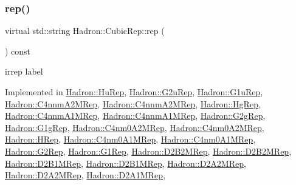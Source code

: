 \subsubsection{\texorpdfstring{rep()}{rep()}\hspace{0.1cm}{\footnotesize\ttfamily [2/2]}}
{\footnotesize\ttfamily virtual std\+::string Hadron\+::\+Cubic\+Rep\+::rep (\begin{DoxyParamCaption}{ }\end{DoxyParamCaption}) const\hspace{0.3cm}{\ttfamily [pure virtual]}}

irrep label 

Implemented in \mbox{\hyperlink{structHadron_1_1HuRep_a4c8b93e1cd7db1a4bacd489f7bb90dbd}{Hadron\+::\+Hu\+Rep}}, \mbox{\hyperlink{structHadron_1_1G2uRep_ad0a703d8c70aacc4601afb6c47ca40b3}{Hadron\+::\+G2u\+Rep}}, \mbox{\hyperlink{structHadron_1_1G1uRep_a3c25822b246f892ed1eef8aeb4ae8252}{Hadron\+::\+G1u\+Rep}}, \mbox{\hyperlink{structHadron_1_1C4nnmA2MRep_a08a21eab24db1e7b93cde52766cfee0b}{Hadron\+::\+C4nnm\+A2\+M\+Rep}}, \mbox{\hyperlink{structHadron_1_1C4nnmA2MRep_a08a21eab24db1e7b93cde52766cfee0b}{Hadron\+::\+C4nnm\+A2\+M\+Rep}}, \mbox{\hyperlink{structHadron_1_1HgRep_a229b19e7f1d4fa443b715de9b5ed4454}{Hadron\+::\+Hg\+Rep}}, \mbox{\hyperlink{structHadron_1_1C4nnmA1MRep_af64812449271d9ce89fbba35fc41f7b7}{Hadron\+::\+C4nnm\+A1\+M\+Rep}}, \mbox{\hyperlink{structHadron_1_1C4nnmA1MRep_af64812449271d9ce89fbba35fc41f7b7}{Hadron\+::\+C4nnm\+A1\+M\+Rep}}, \mbox{\hyperlink{structHadron_1_1G2gRep_a18380ef621e1c6761e5a8b3ff7170f87}{Hadron\+::\+G2g\+Rep}}, \mbox{\hyperlink{structHadron_1_1G1gRep_ad03cbfd3310a65b26937f01ebaa044dd}{Hadron\+::\+G1g\+Rep}}, \mbox{\hyperlink{structHadron_1_1C4nm0A2MRep_a32eaa35da406679229721f90a391ff76}{Hadron\+::\+C4nm0\+A2\+M\+Rep}}, \mbox{\hyperlink{structHadron_1_1C4nm0A2MRep_a32eaa35da406679229721f90a391ff76}{Hadron\+::\+C4nm0\+A2\+M\+Rep}}, \mbox{\hyperlink{structHadron_1_1HRep_aa90a43bdbf19213e75180e0457ae36d0}{Hadron\+::\+H\+Rep}}, \mbox{\hyperlink{structHadron_1_1C4nm0A1MRep_aca630b917cc8bdae915cc1ba072b9166}{Hadron\+::\+C4nm0\+A1\+M\+Rep}}, \mbox{\hyperlink{structHadron_1_1C4nm0A1MRep_aca630b917cc8bdae915cc1ba072b9166}{Hadron\+::\+C4nm0\+A1\+M\+Rep}}, \mbox{\hyperlink{structHadron_1_1G2Rep_aa186588eb9d24c8e3ecad3496a16225a}{Hadron\+::\+G2\+Rep}}, \mbox{\hyperlink{structHadron_1_1G1Rep_a2da49f8741322aebd7903da15cb9b751}{Hadron\+::\+G1\+Rep}}, \mbox{\hyperlink{structHadron_1_1D2B2MRep_a8559e189d9cd0f50fdf541f757661332}{Hadron\+::\+D2\+B2\+M\+Rep}}, \mbox{\hyperlink{structHadron_1_1D2B2MRep_a8559e189d9cd0f50fdf541f757661332}{Hadron\+::\+D2\+B2\+M\+Rep}}, \mbox{\hyperlink{structHadron_1_1D2B1MRep_acdc6dd62590a2ab336e6f7669c63ed3f}{Hadron\+::\+D2\+B1\+M\+Rep}}, \mbox{\hyperlink{structHadron_1_1D2B1MRep_acdc6dd62590a2ab336e6f7669c63ed3f}{Hadron\+::\+D2\+B1\+M\+Rep}}, \mbox{\hyperlink{structHadron_1_1D2A2MRep_af770f75006ed187caad6a1bf3df3e64e}{Hadron\+::\+D2\+A2\+M\+Rep}}, \mbox{\hyperlink{structHadron_1_1D2A2MRep_af770f75006ed187caad6a1bf3df3e64e}{Hadron\+::\+D2\+A2\+M\+Rep}}, \mbox{\hyperlink{structHadron_1_1D2A1MRep_ae86f915110783280c85121414a31e18f}{Hadron\+::\+D2\+A1\+M\+Rep}}, 